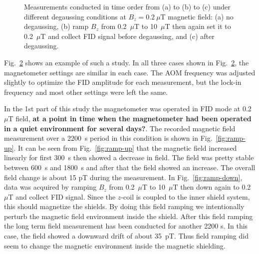 \begin{figure}
\begin{subfigure}[b]{0.49\textwidth}
    \caption{}
    \label{fig:degauss}
  \end{subfigure}
  \caption{Measurements conducted in time order from (a) to (b) to (c)
    under different degaussing conditions at $B_z=0.2~\mu$T magnetic
    field: (a) no degaussing, (b) ramp $B_z$ from 0.2~$\mu$T to
    10~$\mu$T then again set it to 0.2~$\mu$T and collect FID signal
    before degaussing, and (c) after degaussing.}
  \label{fig:ramp-updown}
\end{figure}

Fig.~\ref{fig:ramp-updown} shows an example of such a study.  In all
three cases shown in Fig.~\ref{fig:ramp-updown}, the magnetometer
settings are similar in each case.  The AOM frequency was adjusted
slightly to optimize the FID amplitude for each measurement, but the
lock-in frequency and most other settings were left the same.
  
In the 1st part of this study the magnetometer was operated in FID
mode at 0.2~$\mu$T field, {\bf at a point in time when the
  magnetometer had been operated in a quiet environment for several
  days?}. The recorded magnetic field measurement over a 2200~s period
in this condition is shown in Fig.~\ref{fig:ramp-up}.  It can be seen
from Fig.~\ref{fig:ramp-up} that the magnetic field increased linearly
for first 300~s then showed a decrease in field. The field was pretty
stable between 600~s and 1800~s and after that the field showed an
increase. The overall field change is about 15 pT during the
measurement.  In Fig.~\ref{fig:ramp-down}, data was acquired by
ramping $B_z$ from 0.2~$\mu$T to 10~$\mu$T then down again to
0.2~$\mu$T and collect FID signal.  Since the $z$-coil is coupled to
the inner shield system, this should magnetize the shields.  By doing
this field ramping we intentionally perturb the magnetic field
environment inside the shield.  After this field ramping the long term
field measurement has been conducted for another 2200 s. In this case,
the field showed a downward drift of about 35~pT.  Thus field ramping
did seem to change the magnetic environment inside the magnetic
shielding.

